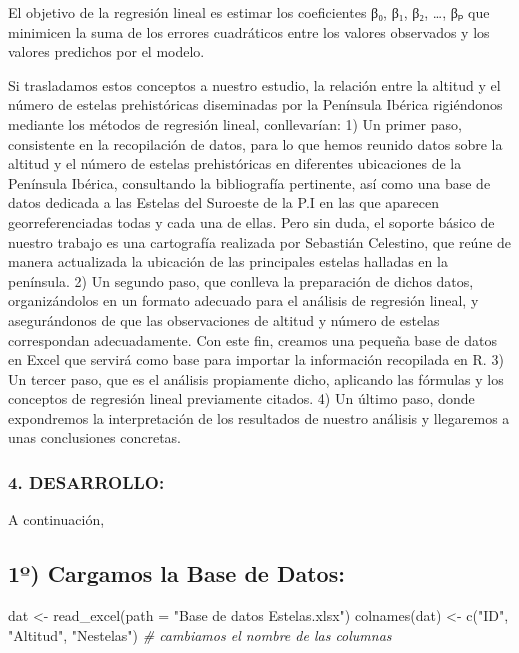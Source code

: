 \documentclass[
]{article}
\newenvironment{Shaded}{\begin{snugshade}}{\end{snugshade}}
\newcommand{\AttributeTok}[1]{\textcolor[rgb]{0.77,0.63,0.00}{#1}}
\newcommand{\CommentTok}[1]{\textcolor[rgb]{0.56,0.35,0.01}{\textit{#1}}}
\newcommand{\FunctionTok}[1]{\textcolor[rgb]{0.00,0.00,0.00}{#1}}
\newcommand{\NormalTok}[1]{#1}
\newcommand{\OtherTok}[1]{\textcolor[rgb]{0.56,0.35,0.01}{#1}}
\newcommand{\StringTok}[1]{\textcolor[rgb]{0.31,0.60,0.02}{#1}}
\begin{document}
El objetivo de la regresión lineal es estimar los coeficientes β₀, β₁,
β₂, \ldots, βₚ que minimicen la suma de los errores cuadráticos entre
los valores observados y los valores predichos por el modelo.

Si trasladamos estos conceptos a nuestro estudio, la relación entre la
altitud y el número de estelas prehistóricas diseminadas por la
Península Ibérica rigiéndonos mediante los métodos de regresión lineal,
conllevarían: 1) Un primer paso, consistente en la recopilación de
datos, para lo que hemos reunido datos sobre la altitud y el número de
estelas prehistóricas en diferentes ubicaciones de la Península Ibérica,
consultando la bibliografía pertinente, así como una base de datos
dedicada a las Estelas del Suroeste de la P.I en las que aparecen
georreferenciadas todas y cada una de ellas. Pero sin duda, el soporte
básico de nuestro trabajo es una cartografía realizada por Sebastián
Celestino, que reúne de manera actualizada la ubicación de las
principales estelas halladas en la península. 2) Un segundo paso, que
conlleva la preparación de dichos datos, organizándolos en un formato
adecuado para el análisis de regresión lineal, y asegurándonos de que
las observaciones de altitud y número de estelas correspondan
adecuadamente. Con este fin, creamos una pequeña base de datos en Excel
que servirá como base para importar la información recopilada en R. 3)
Un tercer paso, que es el análisis propiamente dicho, aplicando las
fórmulas y los conceptos de regresión lineal previamente citados. 4) Un
último paso, donde expondremos la interpretación de los resultados de
nuestro análisis y llegaremos a unas conclusiones concretas.

\hypertarget{desarrollo}{%
\subsubsection{4. DESARROLLO:}\label{desarrollo}}

A continuación,

\hypertarget{uxba-cargamos-la-base-de-datos}{%
\subsection{1º) Cargamos la Base de
Datos:}\label{uxba-cargamos-la-base-de-datos}}

\begin{Shaded}
\begin{Highlighting}[]
\NormalTok{dat }\OtherTok{\textless{}{-}} \FunctionTok{read\_excel}\NormalTok{(}\AttributeTok{path =} \StringTok{"Base de datos Estelas.xlsx"}\NormalTok{)}
\FunctionTok{colnames}\NormalTok{(dat) }\OtherTok{\textless{}{-}} \FunctionTok{c}\NormalTok{(}\StringTok{"ID"}\NormalTok{, }\StringTok{"Altitud"}\NormalTok{, }\StringTok{"Nestelas"}\NormalTok{) }\CommentTok{\# cambiamos el nombre de las columnas}
\end{Highlighting}
\end{Shaded}
\end{document}
